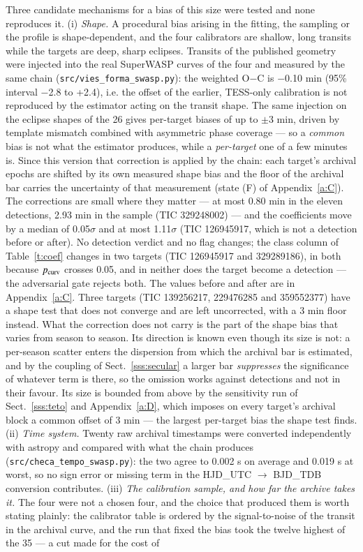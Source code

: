 \documentclass{aa}
\begin{document}
Three candidate mechanisms for a bias of this size were tested and none reproduces it. (i) \textit{Shape.} A procedural bias arising in the fitting, the sampling or the profile is shape-dependent, and the four calibrators are shallow, long transits while the targets are deep, sharp eclipses. Transits of the published geometry were injected into the real SuperWASP curves of the four and measured by the same chain (\texttt{src/\allowbreak vies\_\allowbreak forma\_\allowbreak swasp.py}): the weighted O$-$C is $-$0.10 min (95\% interval $-$2.8 to +2.4), i.e. the offset of the earlier, TESS-only calibration is not reproduced by the estimator acting on the transit shape. The same injection on the eclipse shapes of the 26 gives per-target biases of up to $\pm$3 min, driven by template mismatch combined with asymmetric phase coverage --- so a \textit{common} bias is not what the estimator produces, while a \textit{per-target} one of a few minutes is. Since this version that correction is applied by the chain: each target's archival epochs are shifted by its own measured shape bias and the floor of the archival bar carries the uncertainty of that measurement (state (F) of Appendix~\ref{a:C}). The corrections are small where they matter --- at most 0.80 min in the eleven detections, 2.93 min in the sample (TIC 329248002) --- and the coefficients move by a median of 0.05$\sigma$ and at most 1.11$\sigma$ (TIC 126945917, which is not a detection before or after). No detection verdict and no flag changes; the class column of Table~\ref{t:coef} changes in two targets (TIC 126945917 and 329289186), in both because $p_{\rm curv}$ crosses 0.05, and in neither does the target become a detection --- the adversarial gate rejects both. The values before and after are in Appendix~\ref{a:C}. Three targets (TIC 139256217, 229476285 and 359552377) have a shape test that does not converge and are left uncorrected, with a 3 min floor instead. What the correction does not carry is the part of the shape bias that varies from season to season. Its direction is known even though its size is not: a per-season scatter enters the dispersion from which the archival bar is estimated, and by the coupling of Sect.~\ref{sss:secular} a larger bar \textit{suppresses} the significance of whatever term is there, so the omission works against detections and not in their favour. Its size is bounded from above by the sensitivity run of Sect.~\ref{sss:teto} and Appendix~\ref{a:D}, which imposes on every target's archival block a common offset of 3 min --- the largest per-target bias the shape test finds. (ii) \textit{Time system.} Twenty raw archival timestamps were converted independently with astropy and compared with what the chain produces (\texttt{src/\allowbreak checa\_\allowbreak tempo\_\allowbreak swasp.py}): the two agree to 0.002 s on average and 0.019 s at worst, so no sign error or missing term in the HJD\_UTC $\rightarrow$ BJD\_TDB conversion contributes. (iii) \textit{The calibration sample, and how far the archive takes it.} The four were not a chosen four, and the choice that produced them is worth stating plainly: the calibrator table is ordered by the signal-to-noise of the transit in the archival curve, and the run that fixed the bias took the twelve highest of the 35 --- a cut made for the cost of 
\end{document}
